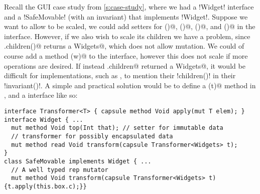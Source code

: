 Recall the GUI case study from \autoref{s:case-study}, where we had a \Q!Widget! interface and a \Q!SafeMovable! (with an invariant) that implements \Q!Widget!.
Suppose we want to allow \Q@Widget@s to be scaled, we could add \Q@mut@ setters for \Q@width()@, \Q@height()@, \Q@left()@, and \Q@top()@ in the \Q@Widget@ interface. However, if we also wish to scale its children we have a problem, since \Q@Widget.children()@ returns a \Q@read Widgets@, which does not allow mutation. We could of course add a \Q@mut@ method \Q@zoom(w)@ to the \Q@Widget@ interface, however this does not scale if more operations are desired. If instead \Q@Widget.children@ returned a \Q@mut Widgets@, it would be difficult for \Q@Widget@ implementations, such as \Q@SafeMovable@, 
to mention their \Q!children()! in their \Q!invariant()!.
A simple and practical solution would be to define a \Q@transform(t)@ method in \Q@Widget@, and a \Q@Transformer@ interface 
like so:
\begin{lstlisting}[escapechar=\%]
interface Transformer<T> { capsule method Void apply(mut T elem); }
interface Widget { ...
  mut method Void top(Int that); // setter for immutable data
  // transformer for possibly encapsulated data
  mut method read Void transform(capsule Transformer<Widgets> t);
}
class SafeMovable implements Widget { ...
  // A well typed rep mutator
  mut method Void transform(capsule Transformer<Widgets> t) {t.apply(this.box.c);}}
\end{lstlisting}
